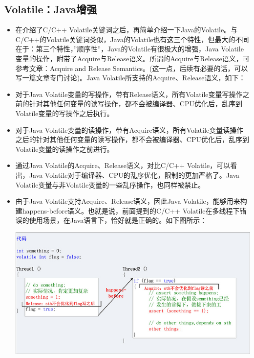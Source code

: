 \documentclass[9pt,b5paper]{article}
\begin{document}
\subsection{Volatile：Java增强}
\label{sec-8-4}
\begin{itemize}
\item 在介绍了C/C++ Volatile关键词之后，再简单介绍一下Java的Volatile。与C/C++的Volatile关键词类似，Java的Volatile也有这三个特性，但最大的不同在于：第三个特性，”顺序性”，Java的Volatile有很极大的增强，Java Volatile变量的操作，附带了Acquire与Release语义。所谓的Acquire与Release语义，可参考文章：Acquire and Release Semantics。(这一点，后续有必要的话，可以写一篇文章专门讨论)。Java Volatile所支持的Acquire、Release语义，如下：
\item 对于Java Volatile变量的写操作，带有Release语义，所有Volatile变量写操作之前的针对其他任何变量的读写操作，都不会被编译器、CPU优化后，乱序到Volatile变量的写操作之后执行。
\item 对于Java Volatile变量的读操作，带有Acquire语义，所有Volatile变量读操作之后的针对其他任何变量的读写操作，都不会被编译器、CPU优化后，乱序到Volatile变量的读操作之前进行。
\item 通过Java Volatile的Acquire、Release语义，对比C/C++ Volatile，可以看出，Java Volatile对于编译器、CPU的乱序优化，限制的更加严格了。Java Volatile变量与非Volatile变量的一些乱序操作，也同样被禁止。
\item 由于Java Volatile支持Acquire、Release语义，因此Java Volatile，能够用来构建happens-before语义。也就是说，前面提到的C/C++ Volatile在多线程下错误的使用场景，在Java语言下，恰好就是正确的。如下图所示：

\includegraphics[width=.9\linewidth]{../pic/v12.jpg}
\end{itemize}
\end{document}
